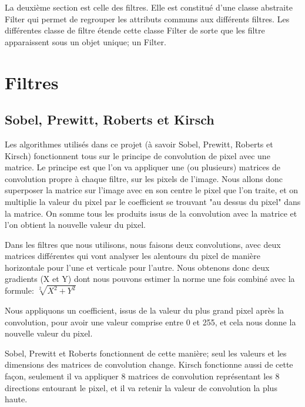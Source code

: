 \documentclass[twoside,openright,a4paper,11pt,french]{article}
\begin{document}
La deuxième section est celle des filtres. Elle est constitué d'une classe abstraite Filter qui permet de regrouper les
attributs communs aux différents filtres.
Les différentes classe de filtre étende cette classe Filter de sorte que les filtre apparaissent sous un objet unique; un Filter.



\section{Filtres}
\label{sec:filtres}

\subsection{Sobel, Prewitt, Roberts et Kirsch}
Les algorithmes utilisés dans ce projet (à savoir Sobel, Prewitt, Roberts et Kirsch)
fonctionnent tous sur le principe de convolution de pixel avec une matrice.
Le principe est que l'on va appliquer une (ou plusieurs) matrices de convolution propre
à chaque filtre, sur les pixels de l'image. Nous allons donc superposer la matrice sur
l'image avec en son centre le pixel que l'on traite, et on multiplie la valeur du pixel
par le coefficient se trouvant "au dessus du pixel" dans la matrice. On somme tous les
produits issus de la convolution avec la matrice et l'on obtient la nouvelle valeur du pixel.

Dans les filtres que nous utilisons, nous faisons deux convolutions, avec deux
matrices différentes qui vont analyser les alentours du pixel de manière
horizontale pour l'une et verticale pour l'autre. Nous obtenons donc deux
gradients (X et Y) dont nous pouvons estimer la norme une fois combiné avec la
formule:
$\sqrt[2]{X^2+Y^2}$

Nous appliquons un coefficient, issus de la valeur du plus grand pixel après la convolution,
pour avoir une valeur comprise entre 0 et 255, et cela nous donne la nouvelle valeur du pixel.

Sobel, Prewitt et Roberts fonctionnent de cette manière; seul les valeurs et
les dimensions des matrices de convolution change.
Kirsch fonctionne aussi de cette façon, seulement il va appliquer 8 matrices de convolution
représentant les 8 directions entourant le pixel, et il va retenir la valeur de convolution
la plus haute.
\end{document}
